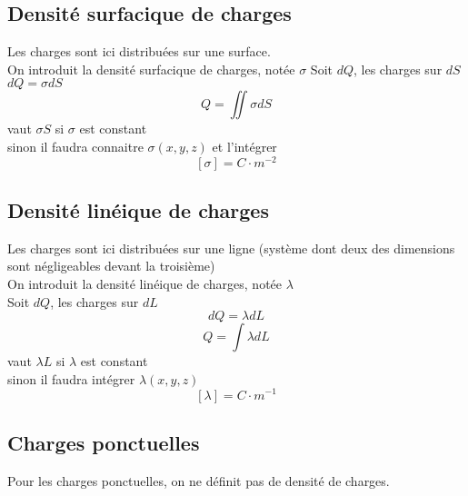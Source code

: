\documentclass[../main.tex]{subfile}
\begin{document}
\subsection{Densité surfacique de charges}
Les charges sont ici distribuées sur une surface.\\
On introduit la densité surfacique de charges, notée $\sigma$
Soit $dQ$, les charges sur $dS$\\
$dQ = \sigma dS$\\
$$Q = \iint \sigma dS$$
vaut $\sigma S$ si $\sigma$ est constant\\
sinon il faudra connaitre $\sigma(x, y, z)$ et l'intégrer\\
$$[\sigma] = C \cdot m^{-2}$$

\subsection{Densité linéique de charges}
Les charges sont ici distribuées sur une ligne (système dont deux des dimensions sont négligeables devant la troisième)\\
On introduit la densité linéique de charges, notée $\lambda$\\
Soit $dQ$, les charges sur $dL$\\
$$dQ = \lambda dL$$
$$Q = \int \lambda dL$$
vaut $\lambda L$ si $\lambda$ est constant\\
sinon il faudra intégrer $\lambda(x, y, z)$\\
$$[\lambda] = C \cdot m^{-1}$$

\subsection{Charges ponctuelles}
Pour les charges ponctuelles, on ne définit pas de densité de charges.
\end{document}
